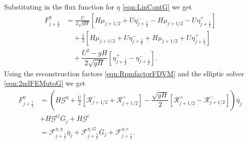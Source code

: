 Substituting in the flux function for $\eta$ \eqref{eqn:LinContG} we get
\begin{align}
F^\eta_{j+\frac{1}{2}} &= \frac{U}{2 \sqrt{gH}} \left[ H\mu_{j+1/2} + U\eta^-_{j+\frac{1}{2}} -  H\mu_{j+1/2} - U \eta^+_{j+\frac{1}{2}} \right]   \nonumber \\ & \quad + \frac{1}{2}\left[H\mu_{j+1/2} + U\eta^-_{j+\frac{1}{2}} +  H\mu_{j+1/2} + U \eta^+_{j+\frac{1}{2}}\right] \nonumber \\ &\quad + \dfrac{U^2 - gH}{2\sqrt{g H}} \left [ \eta^+_{j+\frac{1}{2}} - \eta^-_{j+\frac{1}{2}} \right ].
\end{align}
Using the reconstruction factors \eqref{eqn:RpmfactorFDVM} and the elliptic solver \eqref{eqn:2ndFEMutoG} we get
\begin{align}
F^\eta_{j+\frac{1}{2}} &= \left(H\mathcal{G}^{\eta}  + \frac{U}{2}\left[ \mathcal{R}^-_{j+1/2} +  \mathcal{R}^+_{j+1/2}\right]- \dfrac{\sqrt{gH}}{2} \left [ \mathcal{R}^+_{j+1/2} - \mathcal{R}^-_{j+1/2} \right ] \right) \overline{\eta}_j \nonumber \\& + H\mathcal{G}^G \overline{G}_{j} + H \mathcal{G}^c \nonumber \\ &= \mathcal{F}^{\eta, \eta}_{j+\frac{1}{2}} \overline{\eta}_{j} + \mathcal{F}^{\eta, G}_{j+\frac{1}{2}} \overline{G}_{j} + \mathcal{F}^{\eta, c}_{j+\frac{1}{2}} .
\label{eqn:Fluxfactorsubcriteta}
\end{align}

